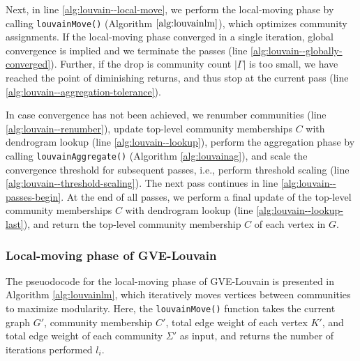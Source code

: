 



Next, in line \ref{alg:louvain--local-move}, we perform the local-moving phase by calling \texttt{louvainMove()} (Algorithm $\ref{alg:louvainlm}$), which optimizes community assignments. If the local-moving phase converged in a single iteration, global convergence is implied and we terminate the passes (line \ref{alg:louvain--globally-converged}). Further, if the drop is community count $|\Gamma|$ is too small, we have reached the point of diminishing returns, and thus stop at the current pass (line \ref{alg:louvain--aggregation-tolerance}).

In case convergence has not been achieved, we renumber communities (line \ref{alg:louvain--renumber}), update top-level community memberships $C$ with dendrogram lookup (line \ref{alg:louvain--lookup}), perform the aggregation phase by calling \texttt{louvainAggregate()} (Algorithm \ref{alg:louvainag}), and scale the convergence threshold for subsequent passes, i.e., perform threshold scaling (line \ref{alg:louvain--threshold-scaling}). The next pass continues in line \ref{alg:louvain--passes-begin}. At the end of all passes, we perform a final update of the top-level community memberships $C$ with dendrogram lookup (line \ref{alg:louvain--lookup-last}), and return the top-level community membership $C$ of each vertex in $G$.


\subsubsection{Local-moving phase of GVE-Louvain}

The pseuodocode for the local-moving phase of GVE-Louvain is presented in Algorithm \ref{alg:louvainlm}, which iteratively moves vertices between communities to maximize modularity. Here, the \texttt{louvainMove()} function takes the current graph $G'$, community membership $C'$, total edge weight of each vertex $K'$, and total edge weight of each community $\Sigma'$ as input, and returns the number of iterations performed $l_i$.

